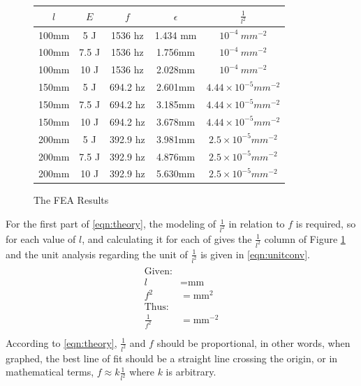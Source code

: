 \documentclass[a4paper,12pt]{article}
\begin{document}
    \begin{figure}[H]%
    \begin{center}
    \begin{tabular}[H]{|c|c||c|c||c|}
    \hline
    $l$ & $E$ & $f$ & $\epsilon$ & $\frac{1}{l^{2}}$\\
    \hline\hline
    100mm & 5 J & 1536 hz & 1.434 mm & $10^{-4}~mm^{-2}$\\
    \hline
    100mm & 7.5 J & 1536 hz & 1.756mm & $10^{-4}~mm^{-2}$ \\
    \hline
    100mm & 10 J & 1536 hz & 2.028mm & $10^{-4}~mm^{-2}$\\
    \hline
    150mm & 5 J & 694.2 hz & 2.601mm & $4.44\times10^{-5}mm^{-2}$\\
    \hline
    150mm & 7.5 J & 694.2 hz & 3.185mm & $4.44\times10^{-5}mm^{-2}$\\
    \hline
    150mm & 10 J & 694.2 hz & 3.678mm & $4.44\times10^{-5}mm^{-2}$\\
    \hline
    200mm & 5 J & 392.9 hz & 3.981mm & $2.5\times10^{-5}mm^{-2}$\\
    \hline
    200mm & 7.5 J & 392.9 hz & 4.876mm & $2.5\times10^{-5}mm^{-2}$\\
    \hline
    200mm & 10 J & 392.9 hz & 5.630mm & $2.5\times10^{-5}mm^{-2}$\\
    \hline
    \end{tabular}
    \end{center}
    \caption{The FEA Results}\label{fig:FEAtable}
    \end{figure}
    For the first part of \eqref{eqn:theory}, the modeling of $\frac{1}{l^{2}}$ in relation to $f$ is required, so for each value of $l$, and calculating it for each of gives the $\frac{1}{l^{2}}$ column of Figure \ref{fig:FEAtable} and the unit analysis regarding the unit of $\frac{1}{l^{2}}$ is given in \eqref{eqn:unitconv}.
    \begin{align}%
    \label{eqn:unitconv}
    \begin{split}
    \text{Given:}\\
    l&=\text{mm}\\
    f^{2}&=\text{mm}^{2}\\
    \text{Thus:}\\
    \frac{1}{f^{2}}&=\text{mm}^{-2}\\
    \end{split}
    \end{align}
    According to \eqref{eqn:theory}, $\frac{1}{l^{2}}$ and $f$ should be proportional, in other words, when graphed, the best line of fit should be a straight line crossing the origin, or in mathematical terms, $f \approx k \frac{1}{l^{2}}$ where $k$ is arbitrary.
\end{document}
